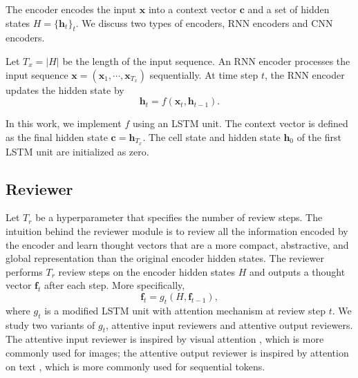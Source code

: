 \documentclass{article}
\begin{document}
The encoder encodes the input $\mathbf{x}$ into a context vector $\mathbf{c}$ and a set of hidden states $H = \{\mathbf{h}_t\}_t$. We discuss two types of encoders, RNN encoders and CNN encoders.

Let $T_x = |H|$ be the length of the input sequence. An RNN encoder processes the input sequence $\mathbf{x} = (\mathbf{x}_1, \cdots, \mathbf{x}_{T_x})$ sequentially. At time step $t$, the RNN encoder updates the hidden state by
\[\mathbf{h}_t = f(\mathbf{x}_t, \mathbf{h}_{t - 1}).\]

In this work, we implement $f$ using an LSTM unit. The context vector is defined as the final hidden state $\mathbf{c} = \mathbf{h}_{T_x}$. The cell state and hidden state $\mathbf{h}_0$ of the first LSTM unit are initialized as zero.


\subsection{Reviewer}

Let $T_r$ be a hyperparameter that specifies the number of review steps. The intuition behind the reviewer module is to review all the information encoded by the encoder and learn thought vectors that are a more compact, abstractive, and global representation than the original encoder hidden states. The reviewer performs $T_r$ review steps on the encoder hidden states $H$ and outputs a thought vector $\mathbf{f}_t$ after each step. More specifically,
\[
\mathbf{f}_t = g_t(H, \mathbf{f}_{t - 1}),
\]
where $g_t$ is a modified LSTM unit with attention mechanism at review step $t$. We study two variants of $g_t$, attentive input reviewers and attentive output reviewers. The attentive input reviewer is inspired by visual attention \cite{xu2015show}, which is more commonly used for images; the attentive output reviewer is inspired by attention on text \cite{bahdanau2014neural}, which is more commonly used for sequential tokens.
\end{document}
